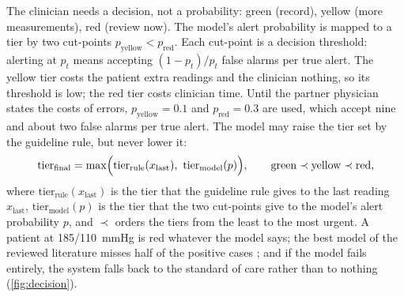 \documentclass[11pt,a4paper,oneside]{report}
\begin{document}
The clinician needs a decision, not a probability: green (record), yellow (more measurements), red (review now). The model's alert probability is mapped to a tier by two cut-points $p_{\text{yellow}} < p_{\text{red}}$. Each cut-point is a decision threshold: alerting at $p_t$ means accepting $(1-p_t)/p_t$ false alarms per true alert. The yellow tier costs the patient extra readings and the clinician nothing, so its threshold is low; the red tier costs clinician time. Until the partner physician states the costs of errors, $p_{\text{yellow}} = 0.1$ and $p_{\text{red}} = 0.3$ are used, which accept nine and about two false alarms per true alert. The model may raise the tier set by the guideline rule, but never lower it:
\begin{equation}
  \text{tier}_{\text{final}} = \max\Bigl(\text{tier}_{\text{rule}}(x_{\text{last}}),\ \text{tier}_{\text{model}}(p)\Bigr), \qquad \text{green} \prec \text{yellow} \prec \text{red},
\end{equation}
where $\text{tier}_{\text{rule}}(x_{\text{last}})$ is the tier that the guideline rule gives to the last reading $x_{\text{last}}$, $\text{tier}_{\text{model}}(p)$ is the tier that the two cut-points give to the model's alert probability $p$, and $\prec$ orders the tiers from the least to the most urgent. A patient at 185/110~mmHg is red whatever the model says; the best model of the reviewed literature misses half of the positive cases \parencite{mendoza2025}; and if the model fails entirely, the system falls back to the standard of care rather than to nothing (\cref{fig:decision}).
\end{document}
